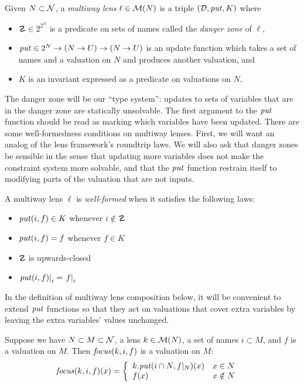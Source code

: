 \begin{definition}
    Given $N\subset\mathcal N$, a \emph{multiway lens} $\ell \in \mathcal M(N)$
    is a triple $(\mathcal D,\mathit{put},K)$ where
    \begin{itemize}
        \item $\danger \in 2^{2^N}$ is a predicate on sets of names called the \emph{danger
            zone} of $\ell$,
        \item $\mathit{put} \in 2^N \to (N \to U) \to (N \to U)$ is an update
            function which takes a set of names and a valuation on $N$ and
            produces another valuation, and
        \item $K$ is an invariant expressed as a predicate on valuations on
            $N$.
    \end{itemize}
\end{definition}

The danger zone will be our ``type system'': updates to sets of variables
that are in the danger zone are statically unsolvable. The first argument to
the $\mathit{put}$ function should be read as marking which variables have been
updated. There are some well-formedness conditions on multiway lenses.
First, we will want an analog of the lens framework's roundtrip laws. We
will also ask that danger zones be sensible in the sense that updating more
variables does not make the constraint system more solvable, and that the
$\mathit{put}$ function restrain itself to modifying parts of the valuation that
are not inputs.

\begin{definition}
    A multiway lens $\ell$ is \emph{well-formed} when it satisfies the
    following laws:
    \begin{itemize}
        \item $\mathit{put}(i,f) \in K$ whenever $i \notin \danger$
        \item $\mathit{put}(i,f) = f$ whenever $f \in K$
        \item $\danger$ is upwards-closed
        \item $\left.\mathit{put}(i,f)\right|_i = \left.f\right|_i$
    \end{itemize}
\end{definition}

In the definition of multiway lens composition below, it will be convenient
to extend $\mathit{put}$ functions so that they act on valuations that cover extra
variables by leaving the extra variables' values unchanged.
\begin{definition}
    Suppose we have $N \subset M \subset \mathcal N$, a lens $k \in \mathcal M(N)$,
    a set of names $i \subset M$, and $f$ is a valuation on $M$. Then
    $\mathit{focus}(k,i,f)$ is a valuation on $M$:
    \begin{align*}
        \mathit{focus}(k,i,f)(x) &= \left\{\begin{array}{ll}
            k.\mathit{put}(i \cap N,f|_N)(x) & x \in N \\
            f(x) & x \notin N
        \end{array}\right.
    \end{align*}
\end{definition}

